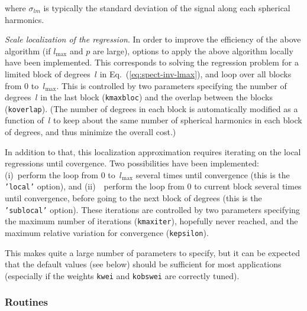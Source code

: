 \documentclass[11pt]{article}
\begin{document}
\noindent
where $\sigma_{lm}$ is typically the standard deviation
of the signal along each spherical harmonics.

{\em Scale localization of the regression}. In order to improve
the efficiency of the above algorithm (if $l_{\max}$ and $p$ are large),
options to apply the above algorithm locally have been implemented.
This corresponds to solving the regression problem
for a limited block of degrees~$l$ in Eq.~(\ref{eq:spect-inv-lmax}),
and loop over all blocks from 0 to~$l_{\max}$.
This is controlled by two parameters specifying
the number of degrees~$l$ in the last block ({\tt kmaxbloc})
and the overlap between the blocks ({\tt koverlap}).
(The number of degrees in each block is automatically modified
as a function of~$l$ to keep about the same number
of spherical harmonics in each block of degrees,
and thus minimize the overall cost.)

In addition to that, this localization approximation requires 
iterating on the local regressions until covergence.
Two possibilities have been implemented:
(i)~perform the loop from 0 to~$l_{\max}$
several times until convergence (this is the {\tt 'local'} option), and
(ii)~~perform the loop from 0 to current block
several times until convergence, before going to the next block of degrees
(this is the {\tt 'sublocal'} option).
These iterations are controlled by two parameters specifying
the maximum number of iterations ({\tt kmaxiter}), hopefully never reached, and
the maximum relative variation for convergence ({\tt kepsilon}).

This makes quite a large number of parameters to specify,
but it can be expected that the default values (see below)
should be sufficient for most applications
(especially if the weights {\tt kwei} and {\tt kobswei} are correctly tuned).

\subsubsection*{Routines}
\end{document}
